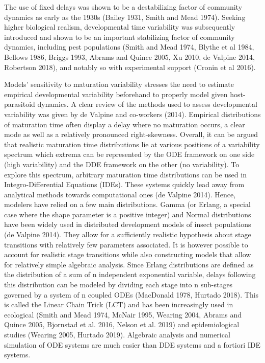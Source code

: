 \documentclass[12pt,a4paper,onecolumn]{article}
\begin{document}
\tabto{1 cm} The use of fixed delays was shown to be a destabilizing factor of community dynamics as early as the 1930s (Bailey 1931, Smith and Mead 1974). Seeking higher biological realism, developmental time variability was subsequently introduced and shown to be an important stabilizing factor of community dynamics, including pest populations (Smith and Mead 1974, Blythe et al 1984, Bellows 1986, Briggs 1993, Abrams and Quince 2005, Xu 2010, de Valpine 2014, Robertson 2018), and notably so with experimental support (Cronin et al 2016). 

\tabto{1 cm} Models' sensitivity to maturation variability stresses the need to estimate empirical developmental variability beforehand to properly model given host-parasitoid dynamics. A clear review of the methods used to assess developmental variability was given by de Valpine and co-workers (2014). Empirical distributions of maturation time often display a delay where no maturation occurs, a clear mode as well as a relatively pronounced right-skewness. Overall, it can be argued that realistic maturation time distributions lie at various positions of a variability spectrum which extrema can be represented by the ODE framework on one side (high variability) and the DDE framework on the other (no variability). To explore this spectrum, arbitrary maturation time distributions can be used in Integro-Differential Equations (IDEs). These systems quickly lead away from analytical methods towards computational ones (de Valpine 2014). Hence, modelers have relied on a few main distributions. Gamma (or Erlang, a special case where the shape parameter is a positive integer) and Normal distributions have been widely used in distributed development models of insect populations (de Valpine 2014). They allow for a sufficiently realistic hypothesis about stage transitions with relatively few parameters associated. It is however possible to account for realistic stage transitions while also constructing models that allow for relatively simple algebraic analysis. Since Erlang distributions are defined as the distribution of a sum of n independent exponential variable, delays following this distribution can be modeled by dividing each stage into n sub-stages governed by a system of n coupled ODEs (MacDonald 1978, Hurtado 2018). This is called the Linear Chain Trick (LCT) and has been increasingly used in ecological (Smith and Mead 1974, McNair 1995, Wearing 2004, Abrams and Quince 2005, Bjornstad et al. 2016, Nelson et al. 2019) and epidemiological studies (Wearing 2005, Hurtado 2019). Algebraic analysis and numerical simulation of ODE systems are much easier than DDE systems and a fortiori IDE systems.\\
\end{document}
